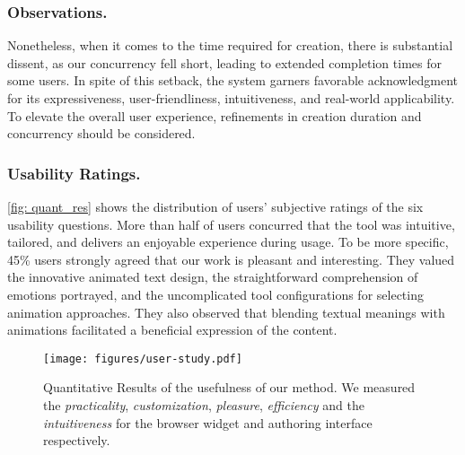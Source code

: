 \subsubsection{Observations.}
Nonetheless, when it comes to the time required for creation, there is substantial dissent, as our concurrency fell short, leading to extended completion times for some users.
In spite of this setback, the system garners favorable acknowledgment for its expressiveness, user-friendliness, intuitiveness, and real-world applicability.
To elevate the overall user experience, refinements in creation duration and concurrency should be considered.

\subsubsection{Usability Ratings.}

\autoref{fig: quant_res} shows the distribution of users' subjective ratings of the six usability questions.
More than half of users concurred that the tool was intuitive, tailored, and delivers an enjoyable experience during usage.
 To be more specific, 45\% users strongly agreed that our work is pleasant and interesting.
 They valued the innovative animated text design, the straightforward comprehension of emotions portrayed, and the uncomplicated tool configurations for selecting animation approaches.
 They also observed that blending textual meanings with animations facilitated a beneficial expression of the content.



\begin{figure}[t]
  \centering
  \texttt{[image: figures/user-study.pdf]}
  \caption{Quantitative Results of the usefulness of our method. We measured the \textit{practicality}, \textit{customization}, \textit{pleasure}, \textit{efficiency} and the \textit{intuitiveness} for the browser widget and authoring interface respectively.}
  \label{fig: quant_res}
\end{figure}


